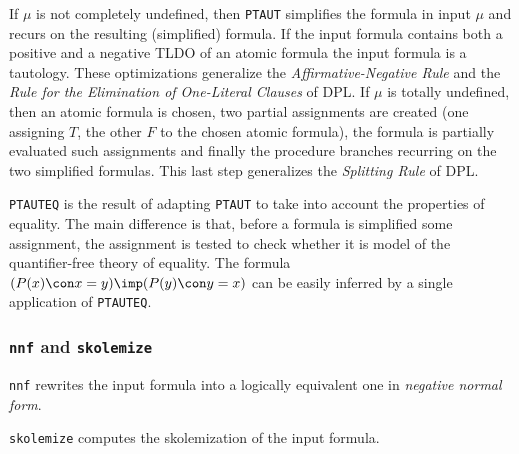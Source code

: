 If $\mu$ is not completely undefined, then {\tt PTAUT} simplifies the
formula in input \wrt $\mu$ and recurs on the resulting (simplified) formula.
If the input formula contains both a positive and a negative TLDO of an
atomic formula the input formula is a tautology.
These optimizations generalize the {\em Affirmative-Negative Rule} and the
{\em Rule for the Elimination of One-Literal Clauses} of DPL.
If $\mu$ is totally undefined, then
an atomic formula is chosen, two partial assignments are created
(one assigning $T$, the other $F$ to the chosen atomic formula),
the formula is partially evaluated \wrt such assignments and finally
the procedure branches recurring on the two simplified formulas.
This last step generalizes the {\em Splitting Rule} of DPL.

{\tt PTAUTEQ} is the result of adapting {\tt PTAUT}
to take into account the properties of equality.
The main difference is that, before a formula is simplified \wrt some
assignment, the assignment is tested to check whether it is model of the
quantifier-free theory of equality.
The formula $(P(x)\con x=y)\imp (P(y)\con y=x)$ can be
easily inferred by a single application of {\tt PTAUTEQ}.

\subsubsection*{{\tt nnf} and {\tt skolemize}}
{\tt nnf} rewrites the input formula into a logically equivalent one in
{\em negative normal form}.

{\tt skolemize} computes the skolemization of the input formula.

